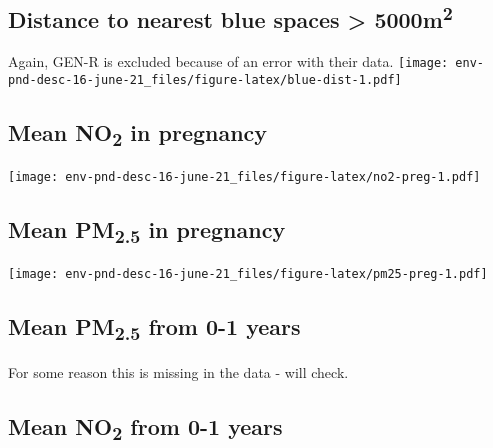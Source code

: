 \documentclass[]{article}
\begin{document}
\newpage

\hypertarget{distance-to-nearest-blue-spaces-5000m2}{%
\subsection{\texorpdfstring{Distance to nearest blue spaces \textgreater{} 5000m\textsuperscript{2}}{Distance to nearest blue spaces \textgreater{} 5000m2}}\label{distance-to-nearest-blue-spaces-5000m2}}

Again, GEN-R is excluded because of an error with their data.
\texttt{[image: env-pnd-desc-16-june-21\_files/figure-latex/blue-dist-1.pdf]}

\newpage

\hypertarget{mean-no2-in-pregnancy}{%
\subsection{\texorpdfstring{Mean NO\textsubscript{2} in pregnancy}{Mean NO2 in pregnancy}}\label{mean-no2-in-pregnancy}}

\texttt{[image: env-pnd-desc-16-june-21\_files/figure-latex/no2-preg-1.pdf]}

\newpage

\hypertarget{mean-pm2.5-in-pregnancy}{%
\subsection{\texorpdfstring{Mean PM\textsubscript{2.5} in pregnancy}{Mean PM2.5 in pregnancy}}\label{mean-pm2.5-in-pregnancy}}

\texttt{[image: env-pnd-desc-16-june-21\_files/figure-latex/pm25-preg-1.pdf]}

\newpage

\hypertarget{mean-pm2.5-from-0-1-years}{%
\subsection{\texorpdfstring{Mean PM\textsubscript{2.5} from 0-1 years}{Mean PM2.5 from 0-1 years}}\label{mean-pm2.5-from-0-1-years}}

For some reason this is missing in the data - will check.

\hypertarget{mean-no2-from-0-1-years}{%
\subsection{\texorpdfstring{Mean NO\textsubscript{2} from 0-1 years}{Mean NO2 from 0-1 years}}\label{mean-no2-from-0-1-years}}
\end{document}
